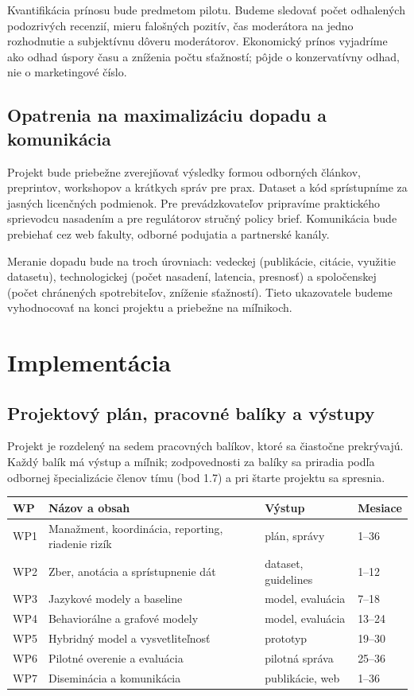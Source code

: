 \documentclass[11pt,a4paper]{article}
\begin{document}
Kvantifikácia prínosu bude predmetom pilotu. Budeme sledovať počet odhalených podozrivých recenzií, mieru falošných pozitív, čas moderátora na jedno rozhodnutie a subjektívnu dôveru moderátorov. Ekonomický prínos vyjadríme ako odhad úspory času a zníženia počtu sťažností; pôjde o konzervatívny odhad, nie o marketingové číslo.

\subsection{Opatrenia na maximalizáciu dopadu a komunikácia}

Projekt bude priebežne zverejňovať výsledky formou odborných článkov, preprintov, workshopov a krátkych správ pre prax. Dataset a kód sprístupníme za jasných licenčných podmienok. Pre prevádzkovateľov pripravíme praktického sprievodcu nasadením a pre regulátorov stručný policy brief. Komunikácia bude prebiehať cez web fakulty, odborné podujatia a partnerské kanály.

Meranie dopadu bude na troch úrovniach: vedeckej (publikácie, citácie, využitie datasetu), technologickej (počet nasadení, latencia, presnosť) a spoločenskej (počet chránených spotrebiteľov, zníženie sťažností). Tieto ukazovatele budeme vyhodnocovať na konci projektu a priebežne na míľnikoch.

\section{Implementácia}

\subsection{Projektový plán, pracovné balíky a výstupy}

Projekt je rozdelený na sedem pracovných balíkov, ktoré sa čiastočne prekrývajú. Každý balík má výstup a míľnik; zodpovednosti za balíky sa priradia podľa odbornej špecializácie členov tímu (bod 1.7) a pri štarte projektu sa spresnia.

\begin{table}[h!]
\centering
\small
\begin{tabularx}{\textwidth}{@{}p{0.8cm} X p{3.0cm} p{1.4cm}@{}}
\toprule
WP & Názov a obsah & Výstup & Mesiace \\
\midrule
WP1 & Manažment, koordinácia, reporting, riadenie rizík & plán, správy & 1--36 \\
WP2 & Zber, anotácia a sprístupnenie dát & dataset, guidelines & 1--12 \\
WP3 & Jazykové modely a baseline & model, evaluácia & 7--18 \\
WP4 & Behaviorálne a grafové modely & model, evaluácia & 13--24 \\
WP5 & Hybridný model a vysvetliteľnosť & prototyp & 19--30 \\
WP6 & Pilotné overenie a evaluácia & pilotná správa & 25--36 \\
WP7 & Diseminácia a komunikácia & publikácie, web & 1--36 \\
\bottomrule
\end{tabularx}
\end{table}
\end{document}
